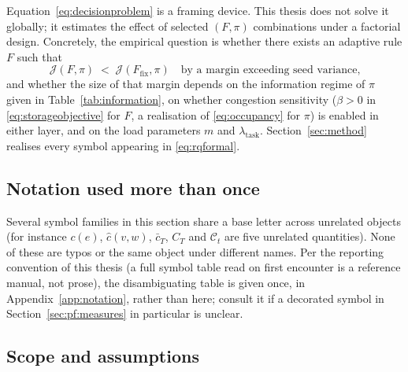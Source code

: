 \documentclass[../main.tex]{subfiles}
\begin{document}
Equation~\eqref{eq:decisionproblem} is a framing device. This thesis does not
solve it globally; it estimates the effect of selected $(F,\pi)$ combinations
under a factorial design. Concretely, the empirical question is whether there
exists an adaptive rule $F$ such that
\begin{equation}
  \mathcal{J}(F, \pi) \;<\; \mathcal{J}(F_{\mathrm{fix}}, \pi)
  \quad \text{by a margin exceeding seed variance,}
  \label{eq:rqformal}
\end{equation}
and whether the size of that margin depends on the information regime of $\pi$
given in Table~\ref{tab:information}, on whether congestion sensitivity
($\beta > 0$ in \eqref{eq:storageobjective} for $F$, a realisation of
\eqref{eq:occupancy} for $\pi$) is enabled in either layer, and on the load
parameters $m$ and $\lambda_{\mathrm{task}}$. Section~\ref{sec:method}
realises every symbol appearing in \eqref{eq:rqformal}.

\subsection{Notation used more than once}
\label{sec:pf:notation}

Several symbol families in this section share a base letter across unrelated %
objects (for instance $c(e)$, $\hat c(v,w)$, $\bar c_T$, $C_T$ and
$\mathcal{C}_t$ are five unrelated quantities). None of these are typos or the
same object under different names. Per the reporting convention of this thesis
(a full symbol table read on first encounter is a reference manual, not
prose), the disambiguating table is given once, in
Appendix~\ref{app:notation}, rather than here; consult it if a decorated symbol
in Section~\ref{sec:pf:measures} in particular is unclear.

\subsection{Scope and assumptions}
\label{sec:pf:scope}
\end{document}
